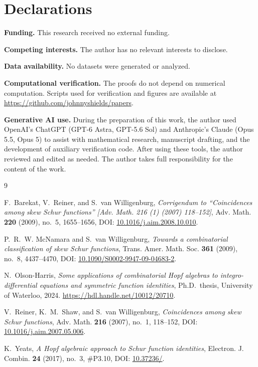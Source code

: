 \documentclass[11pt,a4paper]{amsart}
\numberwithin{equation}{section}
\theoremstyle{plain}
\theoremstyle{definition}
\begin{document}
\section*{Declarations}
{\footnotesize

\noindent\textbf{Funding.} This research received no external funding.

\smallskip
\noindent\textbf{Competing interests.} The author has no relevant interests to disclose.

\smallskip
\noindent\textbf{Data availability.} No datasets were generated or analyzed.

\smallskip
\noindent\textbf{Computational verification.} The proofs do not depend on numerical computation.  Scripts used for verification and figures are available at \url{https://github.com/johnnyshields/papers}.

\smallskip
\noindent\textbf{Generative AI use.} During the preparation of this work, the author used OpenAI's ChatGPT (GPT-6 Astra, GPT-5.6 Sol) and Anthropic's Claude (Opus 5.5, Opus 5) to assist with mathematical research, manuscript drafting, and the development of auxiliary verification code.  After using these tools, the author reviewed and edited as needed.  The author takes full responsibility for the content of the work.\par}

\begin{thebibliography}{9}

F.~Barekat, V.~Reiner, and S.~van Willigenburg,
\emph{Corrigendum to ``Coincidences among skew Schur functions'' [Adv. Math. 216 (1) (2007) 118--152]},
Adv. Math. \textbf{220} (2009), no.~5, 1655--1656,
DOI: \href{https://doi.org/10.1016/j.aim.2008.10.010}{10.1016/\allowbreak j.aim.2008.10.010}.

P.~R.~W. McNamara and S.~van Willigenburg,
\emph{Towards a combinatorial classification of skew Schur functions},
Trans. Amer. Math. Soc. \textbf{361} (2009), no.~8, 4437--4470,
DOI: \href{https://doi.org/10.1090/S0002-9947-09-04683-2}{10.1090/\allowbreak S0002-9947-09-04683-2}.

N.~Olson-Harris,
\emph{Some applications of combinatorial Hopf algebras to integro-differential equations and symmetric function identities},
Ph.D.\ thesis, University of Waterloo, 2024.
\url{https://hdl.handle.net/10012/20710}.

V.~Reiner, K.~M.~Shaw, and S.~van Willigenburg,
\emph{Coincidences among skew Schur functions},
Adv. Math. \textbf{216} (2007), no.~1, 118--152,
DOI: \href{https://doi.org/10.1016/j.aim.2007.05.006}{10.1016/\allowbreak j.aim.2007.05.006}.

K.~Yeats,
\emph{A Hopf algebraic approach to Schur function identities},
Electron. J. Combin. \textbf{24} (2017), no.~3, \#P3.10,
DOI: \href{https://doi.org/10.37236/5741}{10.37236/}.

\end{thebibliography}
\end{document}
